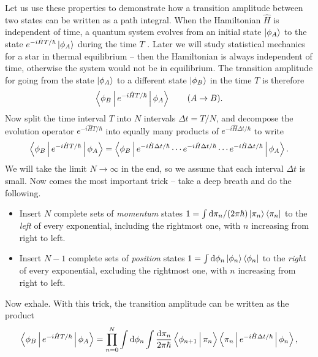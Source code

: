 Let us use these properties to demonstrate how a transition amplitude between two states can be written as a path integral.
When the Hamiltonian $\hat{H}$ is independent of time, a quantum system evolves from an initial state $\ket{\phi_A}$ to the state $e^{-i \hat{H} T / \hbar} \ket{\phi_A}$ during the time $T$ \cite[equation 2.28]{ref:sakurai}.
Later we will study statistical mechanics for a star in thermal equilibrium -- then the Hamiltonian is always independent of time, otherwise the system would not be in equilibrium.
The transition amplitude for going from the state $\ket{\phi_A}$ to a different state $\ket{\phi_B}$ in the time $T$ is therefore
\begin{equation}
	\Braket{\phi_B | e^{- i \hat{H} T / \hbar} | \phi_A} \qquad (A \rightarrow B) .
	\label{eq:tft:transition_amplitude_intro}
\end{equation}
Now split the time interval $T$ into $N$ intervals $\Delta t = T / N$, and decompose the evolution operator $e^{- i \hat{H} T / \hbar}$ into equally many products of $e^{- i \hat{H} \Delta t / \hbar}$ to write
\newcommand\pointarrow[1]{\underset{\underset{\displaystyle #1}{\displaystyle \uparrow}}{}}
\begin{equation}
	\Braket{\phi_B | e^{- i \hat{H} T / \hbar} | \phi_A} = \Braket{\phi_B | e^{- i \hat{H} \Delta t / \hbar} \cdots e^{- i \hat{H} \Delta t / \hbar} \cdots e^{- i \hat{H} \Delta t / \hbar} | \phi_A} .
\label{eq:tft:time_evolution_splitting}
\end{equation}
We will take the limit $N \rightarrow \infty$ in the end, so we assume that each interval $\Delta t$ is small.
Now comes the most important trick -- take a deep breath and do the following.
\begin{itemize}
\item Insert $N$ complete sets of \emph{momentum} states $1 = \int \mathop{}\!\mathrm{d} \pi_n / (2 \pi \hbar) \ket{\pi_n} \bra{\pi_n}$ to the \emph{left} of every exponential, including the rightmost one, with $n$ increasing from right to left.
\item Insert $N-1$ complete sets of \emph{position} states $1 = \int \mathop{}\!\mathrm{d} \phi_n \ket{\phi_n} \bra{\phi_n}$ to the \emph{right} of every exponential, excluding the rightmost one, with $n$ increasing from right to left.
\end{itemize}
Now exhale.
With this trick, the transition amplitude can be written as the product
\begin{equation}
	\transampl = \prod_{n=0}^{N} \int \dif \phi_n \int \frac{\dif \pi_n}{2 \pi \hbar} 
	             \Braket{\phi_{n+1} | \vphantom{e^{\hat{H}}} \pi_n} \Braket{\pi_n | e^{- i \hat{H} \Delta t / \hbar} | \phi_n} ,
\label{eq:tft:transition_amplitude_product}
\end{equation}
